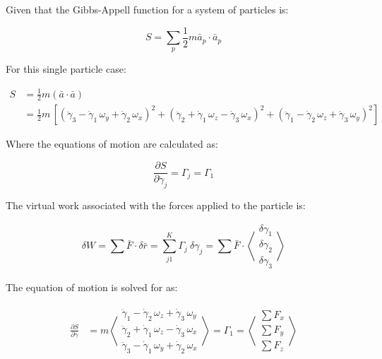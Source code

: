 \documentclass[12pt, letterpaper]{../assignment}
\begin{document}
Given that the Gibbs-Appell function for a system of particles is:

$$ S = \sum_p \frac{1}{2} m \bar{a}_p \cdot \bar{a}_p  $$

For this single particle case:

\begin{equation*}
\begin{aligned}
S &= \frac{1}{2} m \left( \bar{a}\cdot \bar{a} \right) \\
  &= \frac{1}{2}m\,{\left[
                  {{\left({\ddot{\gamma} }_3 -{\dot{\gamma} }_1 \,\omega_y +{\dot{\gamma} }_2 \,\omega_x \right)}}^2 +
                  {{\left({\ddot{\gamma} }_2 +{\dot{\gamma} }_1 \,\omega_z -{\dot{\gamma} }_3 \,\omega_x \right)}}^2+
                  {{\left({\ddot{\gamma} }_1 -{\dot{\gamma} }_2 \,\omega_z +{\dot{\gamma} }_3 \,\omega_y \right)}}^2
                  \right]}
\end{aligned}
\end{equation*}

Where the equations of motion are calculated as:

$$ \frac{\partial S}{\partial \ddot{\gamma}_j} =
\Gamma_j = \Gamma_1 $$ %

The virtual work associated with the forces applied to the particle is:

$$ \delta W = 
\sum \bar{F} \cdot \delta \bar{r} = 
\sum_{j1}^K
\Gamma_j\ \delta \gamma_j = %
\sum \bar{F} \cdot \left<\begin{array}{c}
  \delta \gamma_1 \\
  \delta \gamma_2 \\
  \delta \gamma_3
\end{array}\right> $$ 

The equation of motion is solved for as:

\begin{equation*}
\begin{aligned}
    \frac{\partial S}{\partial \ddot{\gamma}} 
      &= m\left<\begin{array}{c}
{\ddot{\gamma} }_1 -{\dot{\gamma} }_2 \,\omega_z +{\dot{\gamma} }_3 \,\omega_y \\
{\ddot{\gamma} }_2 +{\dot{\gamma} }_1 \,\omega_z -{\dot{\gamma} }_3 \,\omega_x \\
{\ddot{\gamma} }_3 -{\dot{\gamma} }_1 \,\omega_y +{\dot{\gamma} }_2 \,\omega_x 
\end{array}\right>
= \Gamma_1 = 
\left<\begin{array}{c}
  \sum F_x \\
  \sum F_y \\
  \sum F_z
  \end{array}\right>
\end{aligned}
\end{equation*}
\end{document}
